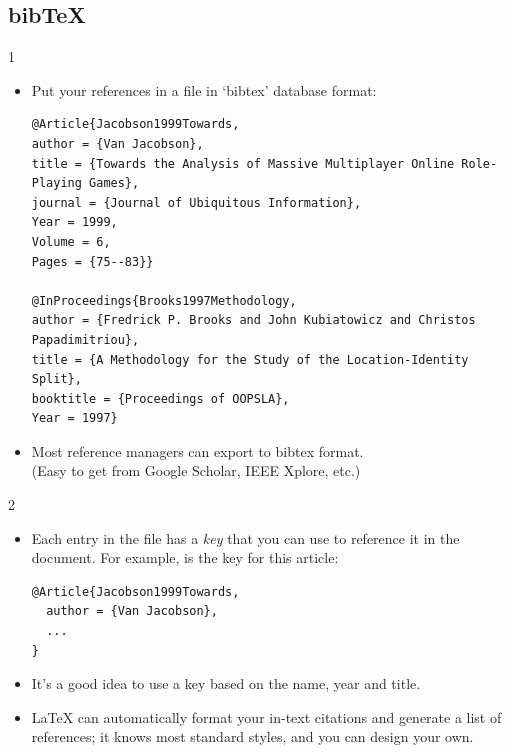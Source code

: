 \documentclass[aspectratio=169]{beamer}
\begin{document}
\subsection{bib\TeX}
\begin{frame}[fragile]{\insertsubsection{} 1}
\begin{itemize}
\item Put your references in a  file in `bibtex' database format:
\begin{lstlisting}
@Article{Jacobson1999Towards,
author = {Van Jacobson},
title = {Towards the Analysis of Massive Multiplayer Online Role-Playing Games},
journal = {Journal of Ubiquitous Information},
Year = 1999,
Volume = 6,
Pages = {75--83}}

@InProceedings{Brooks1997Methodology,
author = {Fredrick P. Brooks and John Kubiatowicz and Christos Papadimitriou},
title = {A Methodology for the Study of the Location-Identity Split},
booktitle = {Proceedings of OOPSLA},
Year = 1997}
\end{lstlisting}
\item Most reference managers can export to bibtex format. \\
(Easy to get from Google Scholar, IEEE Xplore, etc.)
\end{itemize}
\end{frame}

\begin{frame}[fragile]{\insertsubsection{} 2}
\begin{itemize}
\item Each entry in the  file has a \emph{key} that you can use to
reference it in the document. For example,  is the key for this article:
\begin{lstlisting}
@Article{Jacobson1999Towards,
  author = {Van Jacobson},
  ...
}
\end{lstlisting}
\item It's a good idea to use a key based on the name, year and title.
\item \LaTeX{} can automatically format your in-text citations and generate a
list of references; it knows most standard styles, and you can design your own.
\end{itemize}
\end{frame}
\end{document}
